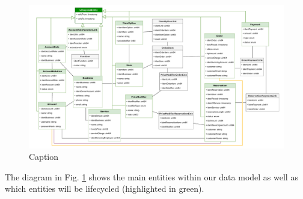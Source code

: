 \documentclass[11pt,a4paper,pdftex]{article}
\begin{document}
\begin{figure}[H]
    \centering
    \includegraphics[width=1\linewidth]{data_model.drawio.pdf}
    \caption{Caption}
    \label{fig:data_model}
\end{figure}

The diagram in Fig. \ref{fig:data_model} shows the main entities within our data model as well as which entities will be lifecycled (highlighted in green).
\end{document}
